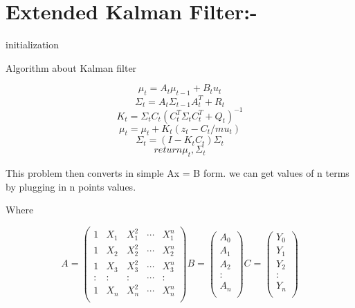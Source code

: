 \section{Extended Kalman Filter:-}
\label{Spline_1}


\begin{algorithmic}[H]
 \KwKalman {}
 initialization\;
 \caption{Algorithm about Kalman filter}
\end{algorithmic}


\begin{equation}
\mu_{t}=A_t \mu_{t-1} + B_t u_t
\end{equation}
\begin{equation}
\Sigma_{t}=A_t \Sigma_{t-1} A_t^T +R_t
\end{equation}
\begin{equation}
K_t = \Sigma_{t} C_t(C_t^T \Sigma_{t}C_t^T+Q_t)^{-1}
\end{equation}
\begin{equation}
\mu_{t}=\mu_{t}+K_t(z_t-C_t /mu_t)
\end{equation}
\begin{equation}
\Sigma_{t}=(I-K_t C_t)\Sigma_{t}
\end{equation}
\begin{equation}
return  \mu_t ,  \Sigma_t
\end{equation} 

This problem then converts in simple Ax = B form. we can get values of n terms by plugging in n points values.

Where

\begin{equation}
A = 
\begin{pmatrix}
  1 & X_{1} & X_{1}^{2} & \cdots & X_{1}^{n} \\
  1 & X_{2} & X_{2}^{2} & \cdots & X_{2}^{n} \\
  1 & X_{3} & X_{3}^{2} & \cdots & X_{3}^{n} \\
  : & :     &     :     & \cdots &    :      \\
  1 & X_{n} & X_{n}^{2} & \cdots & X_{n}^{n} \\
 \end{pmatrix}
B = 
\begin{pmatrix}
  A_{0} \\
  A_{1} \\
  A_{2} \\
  : 	\\
  A_{n} \\
 \end{pmatrix}
 C = 
\begin{pmatrix}
  Y_{0} \\
  Y_{1} \\
  Y_{2} \\
  : 	\\
  Y_{n} \\
 \end{pmatrix}
\end{equation}

